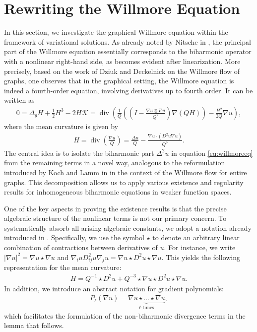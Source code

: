 \documentclass[12pt,a4paper,twoside]{article}
\newcommand{\Kk}{\mathcal {K}}
\renewcommand{\div}{\operatorname{div}}
\begin{document}

\section{Rewriting the Willmore Equation} \label{sec:2}
In this section, we investigate the graphical Willmore equation within the framework of variational solutions. As already noted by Nitsche in \cite{nitsche1993boundary}, the principal part of the Willmore equation essentially corresponds to the biharmonic operator with a nonlinear right-hand side, as becomes evident after linearization. More precisely, based on the work of Dziuk and Deckelnick \cite[(1.5)–(1.9)]{deckelnick2006error} on the Willmore flow of graphs, one observes that in the graphical setting, the Willmore equation is indeed a fourth-order equation, involving derivatives up to fourth order. It can be written as
\begin{align}
  0 =  \Delta_g H + \frac{1}{2}H^3-2H \Kk= \div \left( \frac{1}{Q} \left( \left(I-\frac{\nabla u \otimes \nabla u }{Q^2}
\right) \nabla (Q H) \right) - \frac{H^2 }{2Q} \nabla u\right), \label{eq:willmoreeq}
\end{align}
where the mean curvature is given by
\begin{align*}
    H= \div \left( \frac{\nabla u}{Q} \right) = \frac{\Delta u}{Q} - \frac{\nabla u\cdot ( D^2 u \nabla u)}{Q^3}.
\end{align*}
The central idea is to isolate the biharmonic part $\Delta^2u$ in equation \eqref{eq:willmoreeq} from the remaining terms in a novel way, analogous to the reformulation introduced by Koch and Lamm in \cite[Lemma 3.2, p. 215]{koch2012geometric} in the context of the Willmore flow for entire graphs. This decomposition allows us to apply various existence and regularity results for inhomogeneous biharmonic equations in weaker function spaces.

 One of the key aspects in proving the existence results is that the precise algebraic structure of the nonlinear terms is not our primary concern. To systematically absorb all arising algebraic constants, we adopt a notation already introduced in \cite[p. 215]{koch2012geometric}. Specifically, we use the symbol $\star$ to denote an arbitrary linear combination of contractions between derivatives of $u$. For instance, we write  $|\nabla u|^2 = \nabla u \star \nabla u$ and $\nabla_i u D^2_{ij} u \nabla _j u= \nabla u \star  D^2 u \star \nabla u$. This yields the following representation for the mean curvature:
\begin{align}
    H=   Q^{-1}\star D^2u + Q^{-3}\star\nabla u\star D^2 u \star \nabla u. \label{eq:Hstar}
\end{align}
In addition, we introduce an abstract notation for gradient polynomials:
 \begin{align*}
     P_\ell(\nabla u) = \underbrace{\nabla u\star \dots \star \nabla u }_{\ell \text{-times}},
 \end{align*}
which facilitates the formulation of the non-biharmonic divergence terms in the lemma that follows.
 
\end{document}
